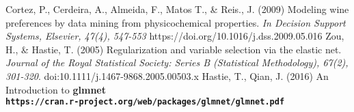 \documentclass[10pt]{article}
\begin{document}
\begin{thebibliography}{9}
Cortez, P., Cerdeira, A., Almeida, F., Matos T., \& Reis., J. (2009)
Modeling wine preferences by data mining from physicochemical properties.
\textit{In Decision Support Systems, Elsevier, 47(4), 547-553}
https://doi.org/10.1016/j.dss.2009.05.016
Zou, H., \& Hastie, T. (2005)
Regularization and variable selection via the elastic net.
\textit{Journal of the Royal Statistical Society: Series B (Statistical Methodology), 67(2), 301-320}.
doi:10.1111/j.1467-9868.2005.00503.x
Hastie, T., Qian, J. (2016)
An Introduction to \bf{glmnet}
\\\texttt{https://cran.r-project.org/web/packages/glmnet/glmnet.pdf}

\end{thebibliography}
\end{document}
